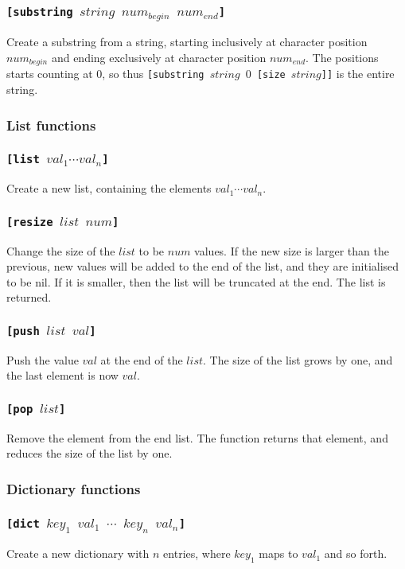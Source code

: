 \documentclass[11pt]{report}
\begin{document}
\subsubsection*{\tt{[substring }$string$ $num_{begin}$ $num_{end}$\tt{]}}
Create a substring from a string, starting inclusively at character position $num_{begin}$ and ending exclusively at character position $num_{end}$. The positions starts counting at $0$, so thus {\tt{[substring }$string$ $0$ \tt{[size }$string$\tt{]]}} is the entire string.

\subsubsection{List functions}
\subsubsection*{\tt{[list }$val_1\cdots val_n$\tt{]}}
Create a new list, containing the elements $val_1\cdots val_n$.

\subsubsection*{\tt{[resize }$list$ $num$\tt{]}}
Change the size of the $list$ to be $num$ values. 
If the new size is larger than the previous, new values will be added to the end of the list, and they are initialised to be nil. If it is smaller, then the list will be truncated at the end. The list is returned.

\subsubsection*{\tt{[push }$list$ $val$\tt{]}}
Push the value $val$ at the end of the $list$. The size of the list grows by one, and the last element is now $val$.

\subsubsection*{\tt{[pop }$list$\tt{]}}
Remove the element from the end list. The function returns that element, and reduces the size of the list by one.

\subsubsection{Dictionary functions}
\subsubsection*{\tt{[dict }$key_1$  $val_1$ $\cdots$ $key_n$ $val_n$\tt{]}}
Create a new dictionary with $n$ entries, where $key_1$ maps to $val_1$ and so forth.
\end{document}
